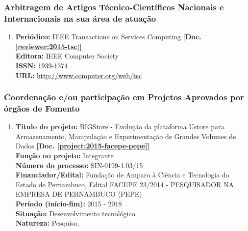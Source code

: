 \documentclass[a4paper,oneside,12pt]{article}
\begin{document}
\subsubsection{Arbitragem de Artigos Técnico-Científicos Nacionais e Internacionais na sua área de atuação}
\vspace{0.3cm}

\begin{enumerate}
\renewcommand{\labelenumi}{{\large\bfseries\arabic{enumi}.}}

\item   \textbf{Periódico:} IEEE Transactions on Services Computing \textbf{[Doc. \ref{reviewer:2015-tsc}]}\\
        \textbf{Editora:} IEEE Computer Society\\
        \textbf{ISSN:} 1939-1374\\
        \textbf{URL:} \url{http://www.computer.org/web/tsc}

\end{enumerate}

\subsubsection{Coordenação e/ou participação em Projetos Aprovados por órgãos de Fomento}
\vspace{0.3cm}

\begin{enumerate}
\renewcommand{\labelenumi}{{\large\bfseries\arabic{enumi}.}}

\item \textbf{Título do projeto:} BIGStore - Evolução da plataforma Ustore para Armazenamento, Manipulação e Experimentação de Grandes Volumes de Dados \textbf{[Doc. \ref{project:2015-facepe-pepe}]}\\
      \textbf{Função no projeto:} Integrante\\
      \textbf{N\'{u}mero do processo:} SIN-0199-1.03/15\\
      \textbf{Financiador/Edital:} Fundação de Amparo à Ciência e Tecnologia do Estado de Pernambuco, Edital FACEPE 23/2014 - PESQUISADOR NA EMPRESA DE PERNAMBUCO (PEPE)\\
      \textbf{Período (início-fim):} 2015 - 2018\\
      \textbf{Situação:} Desenvolvimento tecnológico\\
      \textbf{Natureza:} Pesquisa.

\end{enumerate}
\end{document}
